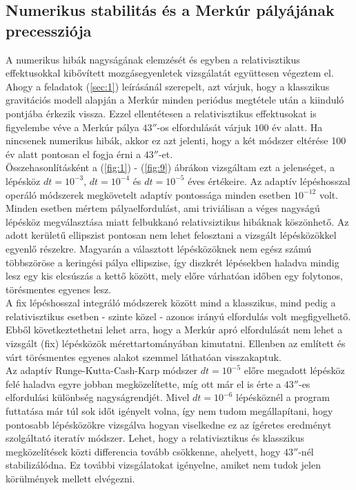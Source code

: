\begin{multicols}{2}
\subsection{Numerikus stabilitás és a Merkúr pályájának precessziója} \label{sub:4.1}
A numerikus hibák nagyságának elemzését és egyben a relativisztikus effektusokkal kibővített mozgásegyenletek vizsgálatát együttesen végeztem el. Ahogy a feladatok (\ref{sec:1}) leírásánál szerepelt, azt várjuk, hogy a klasszikus gravitációs modell alapján a Merkúr minden periódus megtétele után a kiinduló pontjába érkezik vissza. Ezzel ellentétesen a relativisztikus effektusokat is figyelembe véve a Merkúr pálya $43''$-os elfordulását várjuk $100$ év alatt. Ha nincsenek numerikus hibák, akkor ez azt jelenti, hogy a két módszer eltérése 100 év alatt pontosan el fogja érni a $43''$-et. \\
Összehasonlításként a (\ref{fig:1}) - (\ref{fig:9}) ábrákon vizsgáltam ezt a jelenséget, a lépésköz $dt=10^{-3}$, $dt=10^{-4}$ és $dt=10^{-5}$ éves értékeire. Az adaptív lépéshosszal operáló módszerek megkövetelt adaptív pontossága minden esetben $10^{-12}$ volt. \\
Minden esetben mértem pályaelfordulást, ami triviálisan a véges nagyságú lépésköz megválasztása miatt felbukkanó relativsiztikus hibáknak köszönhető. Az adott kerületű ellipszist pontosan nem lehet felosztani a vizsgált lépésközökkel egyenlő részekre. Magyarán a választott lépésközöknek nem egész számú többszöröse a keringési pálya ellipszise, így diszkrét lépésekben haladva mindig lesz egy kis elcsúszás a kettő között, mely előre várhatóan időben egy folytonos, törésmentes egyenes lesz. \\
A fix lépéshosszal integráló módszerek között mind a klasszikus, mind pedig a relativisztikus esetben - szinte közel - azonos irányú elfordulás volt megfigyelhető. Ebből következtethetni lehet arra, hogy a Merkúr apró elfordulását nem lehet a vizsgált (fix) lépésközök mérettartományában kimutatni. Ellenben az említett és várt törésmentes egyenes alakot szemmel láthatóan visszakaptuk. \\
Az adaptív Runge-Kutta-Cash-Karp módszer $dt = 10^{-5}$ előre megadott lépésköz felé haladva egyre jobban megközelítette, míg ott már el is érte a $43''$-es elfordulási különbség nagyságrendjét. Mivel $dt = 10^{-6}$ lépésköznél a program futtatása már túl sok időt igényelt volna, így nem tudom megállapítani, hogy pontosabb lépésközökre vizsgálva hogyan viselkedne ez az ígéretes eredményt szolgáltató iteratív módszer. Lehet, hogy a relativisztikus és klasszikus megközelítések közti differencia tovább csökkenne, ahelyett, hogy $43''$-nél stabilizálódna. Ez további vizsgálatokat igényelne, amiket nem tudok jelen körülmények mellett elvégezni.


\end{multicols}
